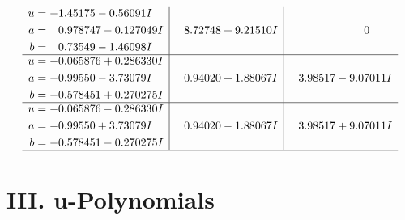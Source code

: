 \documentclass[1p]{elsarticle_modified}
\theoremstyle{definition}
\begin{document}
$$\begin{array}{c|c|c}
\begin{aligned}
u &= -1.45175 - 0.56091 I \\
a &= \phantom{-}0.978747 - 0.127049 I \\
b &= \phantom{-}0.73549 - 1.46098 I\end{aligned}
 & \phantom{-}8.72748 + 9.21510 I & \phantom{-0.000000 } 0 \\ \hline\begin{aligned}
u &= -0.065876 + 0.286330 I \\
a &= -0.99550 - 3.73079 I \\
b &= -0.578451 + 0.270275 I\end{aligned}
 & \phantom{-}0.94020 + 1.88067 I & \phantom{-}3.98517 - 9.07011 I \\ \hline\begin{aligned}
u &= -0.065876 - 0.286330 I \\
a &= -0.99550 + 3.73079 I \\
b &= -0.578451 - 0.270275 I\end{aligned}
 & \phantom{-}0.94020 - 1.88067 I & \phantom{-}3.98517 + 9.07011 I\\
 \hline 
 \end{array}$$\newpage
\newpage\renewcommand{\arraystretch}{1}
\centering \section*{ III. u-Polynomials}
\end{document}
